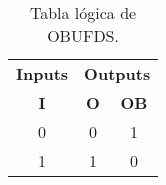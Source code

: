                 \begin{table}[htbp]
                    \centering
                    \caption{Tabla lógica de OBUFDS.}
                    \begin{tabular}{|c|cc|}
                        \hline
                        \textbf{Inputs} & \multicolumn{2}{c|}{\textbf{Outputs}} \\ 
                        \textbf{I}      & \multicolumn{1}{c}{\textbf{O}}  & \textbf{OB} \\ 
                        \hline
                        0      & \multicolumn{1}{c|}{0}  & 1  \\ \hline
                        1      & \multicolumn{1}{c|}{1}  & 0  \\ \hline
                    \end{tabular}
                    \label{tab:obufds}
                \end{table}

                \vspace{0.4cm}
                
\begin{comment}

Datos para programar la tarjeta

Default Board: Basys3
Default Part: xc7a35tcpg236-1
Product: Artix-7
Family: Artix-7
Package: cpg236
Speed Grade: -1

\end{comment}

    


	


